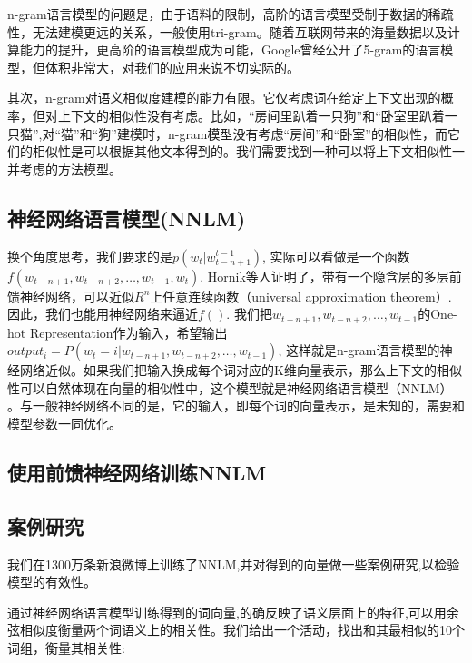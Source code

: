 n-gram语言模型的问题是，由于语料的限制，高阶的语言模型受制于数据的稀疏性，无法建模更远的关系，一般使用tri-gram。随着互联网带来的海量数据以及计算能力的提升，更高阶的语言模型成为可能，Google曾经公开了5-gram的语言模型，但体积非常大，对我们的应用来说不切实际的。

其次，n-gram对语义相似度建模的能力有限。它仅考虑词在给定上下文出现的概率，但对上下文的相似性没有考虑。比如，``房间里趴着一只狗''和``卧室里趴着一只猫'',对``猫''和``狗''建模时，n-gram模型没有考虑``房间''和``卧室''的相似性，而它们的相似性是可以根据其他文本得到的。我们需要找到一种可以将上下文相似性一并考虑的方法模型。

\subsection{神经网络语言模型(NNLM)}
换个角度思考，我们要求的是$p({w_t}|w_{t-n+1}^{t-1})$, 实际可以看做是一个函数$f(w_{t-n+1}, w_{t-n+2}, \ldots, w_{t-1}, w_t)$. Hornik等人证明了，带有一个隐含层的多层前馈神经网络，可以近似$R^n$上任意连续函数（universal approximation theorem\cite{hornik1991approximation}）. 因此，我们也能用神经网络来逼近$f()$. 我们把$w_{t-n+1}, w_{t-n+2}, \ldots, w_{t-1}$的One-hot Representation作为输入，希望输出$output_i=P(w_t=i|w_{t-n+1}, w_{t-n+2}, \ldots, w_{t-1})$, 这样就是n-gram语言模型的神经网络近似。如果我们把输入换成每个词对应的K维向量表示，那么上下文的相似性可以自然体现在向量的相似性中，这个模型就是神经网络语言模型（NNLM）\cite{bengio2006neural} \cite{mikolov2013efficient}。与一般神经网络不同的是，它的输入，即每个词的向量表示，是未知的，需要和模型参数一同优化。

\subsection{使用前馈神经网络训练NNLM}

\subsection{案例研究}
我们在1300万条新浪微博上训练了NNLM,并对得到的向量做一些案例研究,以检验模型的有效性。

通过神经网络语言模型训练得到的词向量,的确反映了语义层面上的特征,可以用余弦相似度衡量两个词语义上的相关性。我们给出一个活动，找出和其最相似的10个词组，衡量其相关性:

